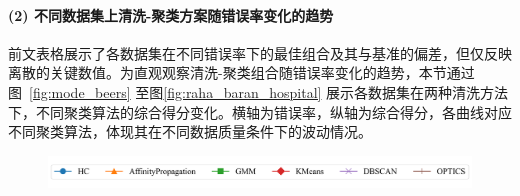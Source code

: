 \documentclass[10pt]{article} %
\numberwithin{equation}{section}
\begin{document}
\paragraph{(2) 不同数据集上清洗-聚类方案随错误率变化的趋势}
前文表格展示了各数据集在不同错误率下的最佳组合及其与基准的偏差，但仅反映离散的关键数值。为直观观察清洗-聚类组合随错误率变化的趋势，本节通过图~\ref{fig:mode_beers} 至图\ref{fig:raha_baran_hospital} 展示各数据集在两种清洗方法下，不同聚类算法的综合得分变化。横轴为错误率，纵轴为综合得分，各曲线对应不同聚类算法，体现其在不同数据质量条件下的波动情况。
\begin{figure}[H]
    \centering
    \includegraphics[width=0.6\linewidth]{figures/legend.png} %
    \vspace{-10pt} %
\end{figure}
\end{document}
